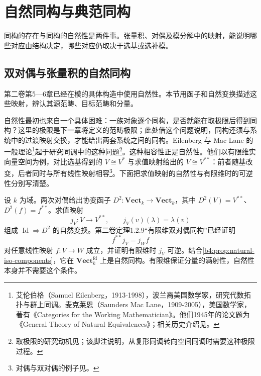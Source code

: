 
\section{自然同构与典范同构}
\label{b4:sec:0104}

同构的存在与同构的自然性是两件事。张量积、对偶及模分解中的映射，能说明哪些对应由结构决定，哪些对应仍取决于选基或选补模。

%
%
%

\subsection{双对偶与张量积的自然同构}
\label{b4:subsec:0104:01}

第二卷第5—6章已经在模的具体构造中使用自然性。本节用函子和自然变换描述这些映射，辨认其源范畴、目标范畴和分量。

\ProseParagraphBreak
自然性最初也来自一个具体困难：一族对象逐个同构，是否就能在取极限后得到同构？这里的极限是下一章将定义的范畴极限；此处借这个问题说明，同构还须与系统中的过渡映射交换，才能给出两套系统之间的同构。Eilenberg 与 Mac Lane 的一般理论\footnote{艾伦伯格（Samuel Eilenberg，1913-1998），波兰裔美国数学家，研究代数拓扑与群上同调。麦克莱恩（Saunders Mac Lane，1909-2005），美国数学家，著有《Categories for the Working Mathematician》。他们1945年的论文题为《General Theory of Natural Equivalences》；相关历史介绍见\cite[Section 7.10]{EtingofEtAl2011RepresentationTheory}。}起于研究同调中的这种问题\footnote{取极限的研究动机见\cite[Introduction, p. 236, especially footnote 4]{EilenbergMacLane1945NaturalEquivalences}；该脚注说明，从复形同调转向空间同调时需要这种极限过程。}。这种相容性正是自然性。他们以有限维实向量空间为例，对比选基得到的 \(V\cong V^*\) 与求值映射给出的 \(V\cong V^{**}\)：前者随基改变，后者同时与所有线性映射相容\footnote{对偶与双对偶的例子见\cite[Introduction, pp. 232--234]{EilenbergMacLane1945NaturalEquivalences}。}。下面把求值映射的自然性与有限维时的可逆性分别写清楚。

\ProseParagraphBreak
设 \(k\) 为域。两次对偶给出协变函子 \(D^2:\mathbf{Vect}_k\rightarrow\mathbf{Vect}_k\)，其中 \(D^2(V)=V^{**}\)、\(D^2(f)=f^{**}\)。求值映射
\[
	j_V:V\longrightarrow V^{**},\qquad j_V(v)(\lambda)=\lambda(v)
\]
组成 \(\operatorname{Id}\Rightarrow D^2\) 的自然变换。第二卷定理1.2.9“有限维双对偶同构”已经证明
\[
	f^{**}j_V=j_Wf
\]
对任意线性映射 \(f:V\rightarrow W\) 成立，并证明有限维时 \(j_V\) 可逆。结合\cref{b4:prop:natural-iso-components}，它在 \(\mathbf{Vect}_k^{\mathrm{fd}}\) 上是自然同构。有限维保证分量的满射性，自然性本身并不需要这个条件。


